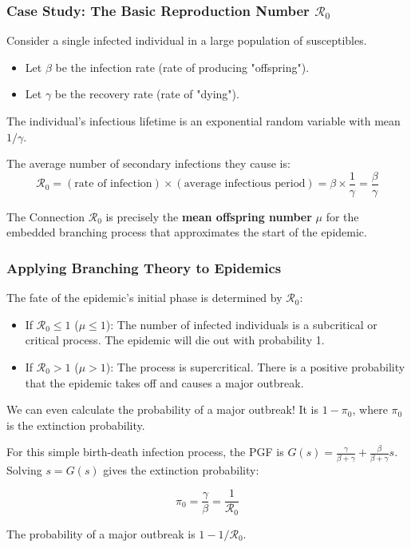 \documentclass[aspectratio=169]{beamer}\usepackage[]{graphicx}\usepackage[]{xcolor}
\begin{document}
\begin{frame}
    \frametitle{Case Study: The Basic Reproduction Number $\mathcal{R}_0$}

    Consider a single infected individual in a large population of susceptibles.
    \begin{itemize}
        \item Let $\beta$ be the infection rate (rate of producing "offspring").
        \item Let $\gamma$ be the recovery rate (rate of "dying").
    \end{itemize}

    The individual's infectious lifetime is an exponential random variable with mean $1/\gamma$.



    The average number of secondary infections they cause is:
    $$ \mathcal{R}_0 = (\text{rate of infection}) \times (\text{average infectious period}) = \beta \times \frac{1}{\gamma} = \frac{\beta}{\gamma} $$

    \begin{block}{The Connection}
    $\mathcal{R}_0$ is precisely the \textbf{mean offspring number} $\mu$ for the embedded branching process that approximates the start of the epidemic.
    \end{block}
\end{frame}

\begin{frame}
    \frametitle{Applying Branching Theory to Epidemics}

    The fate of the epidemic's initial phase is determined by $\mathcal{R}_0$:

    \begin{itemize}
        \item If $\mathcal{R}_0 \le 1$ ($\mu \le 1$): The number of infected individuals is a subcritical or critical process. The epidemic will die out with probability 1.

        \item If $\mathcal{R}_0 > 1$ ($\mu > 1$): The process is supercritical. There is a positive probability that the epidemic takes off and causes a major outbreak.
    \end{itemize}



    We can even calculate the probability of a major outbreak! It is $1 - \pi_0$, where $\pi_0$ is the extinction probability.

    For this simple birth-death infection process, the PGF is $G(s) = \frac{\gamma}{\beta+\gamma} + \frac{\beta}{\beta+\gamma}s$. Solving $s=G(s)$ gives the extinction probability:

    $$ \pi_0 = \frac{\gamma}{\beta} = \frac{1}{\mathcal{R}_0} $$

    The probability of a major outbreak is $1 - 1/\mathcal{R}_0$.
\end{frame}
\end{document}
